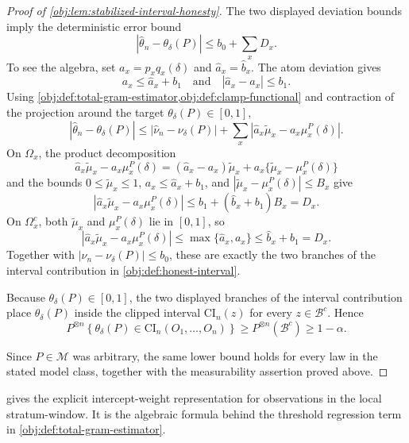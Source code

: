 \documentclass[11pt]{article}
\begin{document}
\begin{proof}[Proof of \cref{obj:lem:stabilized-interval-honesty}]
The two displayed deviation bounds imply the deterministic error bound
\[
        \left|
        \widehat\theta_n-\theta_\delta(P)
        \right|
        \le
        b_0+\sum_xD_x .
\]
To see the algebra, set \(a_x=p_xq_x(\delta)\) and \(\widehat a_x=\widehat b_x\).  The atom deviation gives
\[
        a_x\le \widehat a_x+b_1
        \quad\text{and}\quad
        |\widehat a_x-a_x|\le b_1 .
\]
Using \cref{obj:def:total-gram-estimator,obj:def:clamp-functional} and contraction of the projection around the target \(\theta_\delta(P)\in[0,1]\),
\[
\left|
\widehat\theta_n-\theta_\delta(P)
\right|
\le
|\widehat\nu_n-\nu_\delta(P)|
+
\sum_x
\left|
\widehat a_x\widetilde\mu_x-a_x\mu_x^P(\delta)
\right|.
\]
On \(\Omega_x\), the product decomposition
\[
\widehat a_x\widetilde\mu_x-a_x\mu_x^P(\delta)
=
(\widehat a_x-a_x)\widetilde\mu_x
+
a_x\{\widetilde\mu_x-\mu_x^P(\delta)\}
\]
and the bounds \(0\le \widetilde\mu_x\le1\), \(a_x\le\widehat a_x+b_1\), and
\(|\widetilde\mu_x-\mu_x^P(\delta)|\le B_x\) give
\[
\left|
\widehat a_x\widetilde\mu_x-a_x\mu_x^P(\delta)
\right|
\le
b_1+(\widehat b_x+b_1)B_x
=D_x .
\]
On \(\Omega_x^c\), both \(\widetilde\mu_x\) and \(\mu_x^P(\delta)\) lie in \([0,1]\), so
\[
\left|
\widehat a_x\widetilde\mu_x-a_x\mu_x^P(\delta)
\right|
\le
\max\{\widehat a_x,a_x\}
\le
\widehat b_x+b_1
=D_x .
\]
Together with \(|\widehat\nu_n-\nu_\delta(P)|\le b_0\), these are exactly the two branches of the interval contribution in \cref{obj:def:honest-interval}. %

Because \(\theta_\delta(P)\in[0,1]\), the two displayed branches of the interval contribution place \(\theta_\delta(P)\) inside the clipped interval \(\mathrm{CI}_n(z)\) for every \(z\in\mathcal B^c\).  Hence
\[
 P^{\otimes n}\!\left\{
 \theta_\delta(P)\in \mathrm{CI}_n(O_1,\ldots,O_n)
 \right\}
 \ge
 P^{\otimes n}(\mathcal B^c)
 \ge
 1-\alpha .
\]

Since \(P\in\mathcal M\) was arbitrary, the same lower bound holds for every law in the stated model class, together with the measurability assertion proved above. %
\end{proof}

 gives the explicit intercept-weight representation for observations in the local stratum-window. It is the algebraic formula behind the threshold regression term in \cref{obj:def:total-gram-estimator}.
\end{document}
